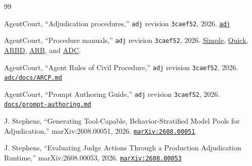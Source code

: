 \documentclass[11pt]{article}
\newcommand{\code}[1]{\texttt{#1}}
\begin{document}
\begingroup
\small
\setlength{\emergencystretch}{3em}
\begin{thebibliography}{99}
\raggedright

AgentCourt, ``Adjudication procedures,'' \code{adj} revision \code{3caef52}, 2026.  \href{https://github.com/agentcourt/adj/tree/3caef52dfcd38009f87dd3965c9c2491c2e49fea}{\code{adj}}

AgentCourt, ``Procedure manuals,'' \code{adj} revision \code{3caef52}, 2026.  \href{https://github.com/agentcourt/adj/blob/3caef52dfcd38009f87dd3965c9c2491c2e49fea/simple/manual.md}{Simple}, \href{https://github.com/agentcourt/adj/blob/3caef52dfcd38009f87dd3965c9c2491c2e49fea/quick/README.md}{Quick}, \href{https://github.com/agentcourt/adj/blob/3caef52dfcd38009f87dd3965c9c2491c2e49fea/arbd/manual.md}{ARBD}, \href{https://github.com/agentcourt/adj/blob/3caef52dfcd38009f87dd3965c9c2491c2e49fea/arb/manual.md}{ARB}, and \href{https://github.com/agentcourt/adj/blob/3caef52dfcd38009f87dd3965c9c2491c2e49fea/adc/manual.md}{ADC}.

AgentCourt, ``Agent Rules of Civil Procedure,'' \code{adj} revision \code{3caef52}, 2026.  \href{https://github.com/agentcourt/adj/blob/3caef52dfcd38009f87dd3965c9c2491c2e49fea/adc/docs/ARCP.md}{\code{adc/docs/ARCP.md}}

AgentCourt, ``Prompt Authoring Guide,'' \code{adj} revision \code{3caef52}, 2026.  \href{https://github.com/agentcourt/adj/blob/3caef52dfcd38009f87dd3965c9c2491c2e49fea/docs/prompt-authoring.md}{\code{docs/prompt-authoring.md}}

J. Stephens, ``Generating Tool-Capable, Behavior-Stratified Model Pools for Adjudication,'' marXiv:2608.00051, 2026.  \href{http://127.0.0.1:8405/abs/2608.00051}{\code{marXiv:2608.00051}}

J. Stephens, ``Evaluating Judge Actions Through a Production Adjudication Runtime,'' marXiv:2608.00053, 2026.  \href{http://127.0.0.1:8405/abs/2608.00053}{\code{marXiv:2608.00053}}

\end{thebibliography}
\endgroup
\end{document}
